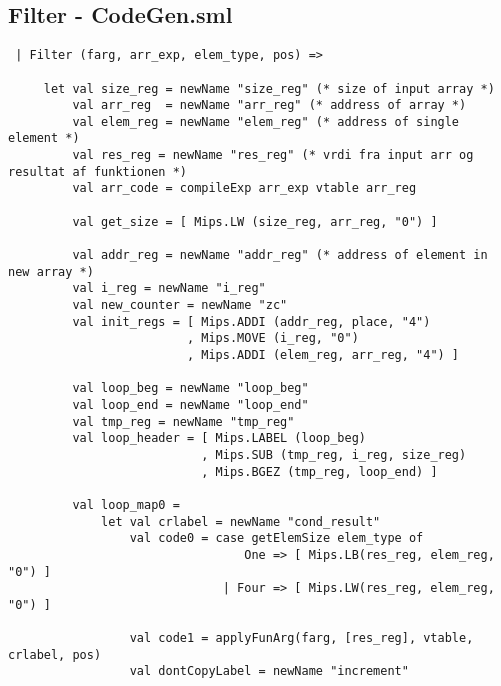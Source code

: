 \documentclass{article}
\begin{document}
\subsection{Filter - CodeGen.sml}\label{app:scan}
\begin{lstlisting}
 | Filter (farg, arr_exp, elem_type, pos) =>      
      
     let val size_reg = newName "size_reg" (* size of input array *)
         val arr_reg  = newName "arr_reg" (* address of array *)
         val elem_reg = newName "elem_reg" (* address of single element *)
         val res_reg = newName "res_reg" (* vrdi fra input arr og resultat af funktionen *) 
         val arr_code = compileExp arr_exp vtable arr_reg

         val get_size = [ Mips.LW (size_reg, arr_reg, "0") ]

         val addr_reg = newName "addr_reg" (* address of element in new array *)
         val i_reg = newName "i_reg"
         val new_counter = newName "zc"
         val init_regs = [ Mips.ADDI (addr_reg, place, "4")
                         , Mips.MOVE (i_reg, "0")
                         , Mips.ADDI (elem_reg, arr_reg, "4") ]

         val loop_beg = newName "loop_beg"
         val loop_end = newName "loop_end"
         val tmp_reg = newName "tmp_reg"
         val loop_header = [ Mips.LABEL (loop_beg)
                           , Mips.SUB (tmp_reg, i_reg, size_reg)
                           , Mips.BGEZ (tmp_reg, loop_end) ]             
                           
         val loop_map0 =
             let val crlabel = newName "cond_result"
                 val code0 = case getElemSize elem_type of
                                 One => [ Mips.LB(res_reg, elem_reg, "0") ]
                              | Four => [ Mips.LW(res_reg, elem_reg, "0") ]

                 val code1 = applyFunArg(farg, [res_reg], vtable, crlabel, pos)
                 val dontCopyLabel = newName "increment"
                 

\end{lstlisting}
\end{document}
